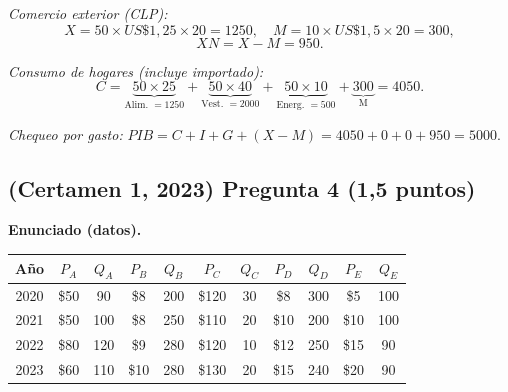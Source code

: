 \documentclass[11pt,addpoints]{article}
\begin{document}
\textit{Comercio exterior (CLP):}
\[
X = 50 \times US\$1{,}25 \times 20 = \boxed{1250}, \quad
M = 10 \times US\$1{,}5 \times 20 = \boxed{300},
\]
\[
XN = X - M = \boxed{950}.
\]

\newpage
\vspace*{0.1cm}
\textit{Consumo de hogares (incluye importado):}
\[
C = \underbrace{50\times 25}_{\text{Alim. }=1250} + \underbrace{50\times 40}_{\text{Vest. }=2000} + \underbrace{50\times 10}_{\text{Energ. }=500} + \underbrace{300}_{\text{M}} = \boxed{4050}.
\]

\textit{Chequeo por gasto:} \(PIB = C + I + G + (X-M) = 4050 + 0 + 0 + 950 = \boxed{5000}.\)



\subsection*{(Certamen 1, 2023) \quad Pregunta 4 (1,5 puntos)}
\textbf{Enunciado (datos).}
\begin{center}
\begin{tabular}{c c c c c c c c c c c}
\toprule
\textbf{Año} & $P_A$ & $Q_A$ & $P_B$ & $Q_B$ & $P_C$ & $Q_C$ & $P_D$ & $Q_D$ & $P_E$ & $Q_E$ \\
\midrule
2020 & \$50 & 90  & \$8  & 200 & \$120 & 30 & \$8  & 300 & \$5  & 100 \\
2021 & \$50 & 100 & \$8  & 250 & \$110 & 20 & \$10 & 200 & \$10 & 100 \\
2022 & \$80 & 120 & \$9  & 280 & \$120 & 10 & \$12 & 250 & \$15 & 90  \\
2023 & \$60 & 110 & \$10 & 280 & \$130 & 20 & \$15 & 240 & \$20 & 90  \\
\bottomrule
\end{tabular}
\end{center}
\end{document}

